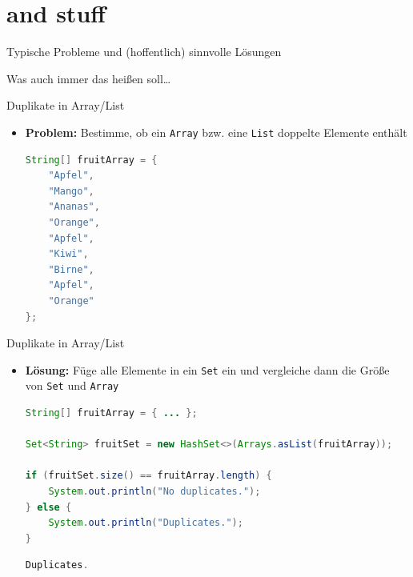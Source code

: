 \documentclass[18pt]{beamer}
\begin{document}
\section{and stuff}

\begin{frame}{\quad}
    \center
    \Huge{Typische Probleme und (hoffentlich) sinnvolle Lösungen}
\end{frame}

\begin{frame}{\quad}
    \center
    Was auch immer das heißen soll\dots
\end{frame}

\begin{frame}[fragile]{Duplikate in Array/List}
    \begin{itemize}
        \item \textbf{Problem:} Bestimme, ob ein \texttt{Array} bzw. eine \texttt{List} doppelte Elemente enthält
        \vspace{.2in}
    \begin{lstlisting}[language=Java,basicstyle=\scriptsize]
String[] fruitArray = {
    "Apfel",
    "Mango",
    "Ananas",
    "Orange",
    "Apfel",
    "Kiwi",
    "Birne",
    "Apfel",
    "Orange"
};
    \end{lstlisting}

    \end{itemize}

\end{frame}

\begin{frame}[fragile]{Duplikate in Array/List}
    \begin{itemize}
        \item \textbf{Lösung:} Füge alle Elemente in ein \texttt{Set} ein und vergleiche dann die Größe von \texttt{Set} und \texttt{Array}

        \vspace{.2in}

        \begin{lstlisting}[language=Java,basicstyle=\scriptsize]
String[] fruitArray = { ... };

Set<String> fruitSet = new HashSet<>(Arrays.asList(fruitArray));

if (fruitSet.size() == fruitArray.length) {
    System.out.println("No duplicates.");
} else {
    System.out.println("Duplicates.");
}
        \end{lstlisting}

\begin{exampleblock}{}
\begin{lstlisting}[language=Java,basicstyle=\scriptsize]
Duplicates.
\end{lstlisting}

\end{exampleblock}


    \end{itemize}
\end{frame}
\end{document}
